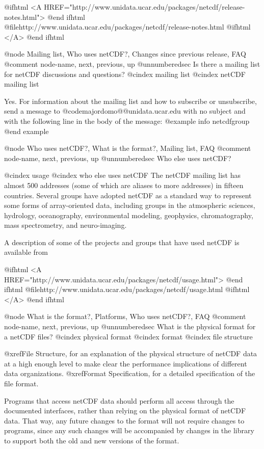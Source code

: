 {@ifhtml
<A
HREF="http://www.unidata.ucar.edu/packages/netcdf/release-notes.html">
@end ifhtml
@file{http://www.unidata.ucar.edu/packages/netcdf/release-notes.html}
@ifhtml
</A>
@end ifhtml

@node Mailing list, Who uses netCDF?, Changes since previous release, FAQ
@comment  node-name,  next,  previous,  up
@unnumberedsec Is there a mailing list for netCDF discussions and questions?
@cindex mailing list
@cindex netCDF mailing list

Yes.
For information about the mailing list
and how to subscribe or unsubscribe, send a message to
@code{majordomo@@unidata.ucar.edu} with no subject and with the
following line in the body of the message:
@example
info netcdfgroup
@end example


@node Who uses netCDF?, What is the format?, Mailing list, FAQ
@comment  node-name,  next,  previous,  up
@unnumberedsec Who else uses netCDF?

@cindex usage
@cindex who else uses netCDF
The netCDF mailing list has almost 500 addresses
(some of which are aliases to more addresses) in fifteen countries.
Several groups have adopted netCDF as a standard way to represent some
forms of array-oriented data, including groups in the atmospheric
sciences, hydrology, oceanography, environmental modeling, geophysics,
chromatography, mass spectrometry, and neuro-imaging.

A description of some of the projects and groups that have used netCDF is
available from

@ifhtml
<A
HREF="http://www.unidata.ucar.edu/packages/netcdf/usage.html">
@end ifhtml
@file{http://www.unidata.ucar.edu/packages/netcdf/usage.html}
@ifhtml
</A>
@end ifhtml

@node What is the format?, Platforms, Who uses netCDF?, FAQ
@comment  node-name,  next,  previous,  up
@unnumberedsec What is the physical format for a netCDF files?
@cindex physical format
@cindex format
@cindex file structure

@xref{File Structure}, for an
explanation of the physical structure of netCDF data at a
high enough level to make clear the performance implications of
different data organizations.  @xref{Format Specification}, for a
detailed specification of the file format.

Programs that access netCDF data should perform all access through the
documented interfaces, rather than relying on the physical format
of netCDF data.  That way, any future changes to the format will not
require changes to programs, since any such changes will be accompanied
by changes in the library to support both the old and new versions of
the format.

}
